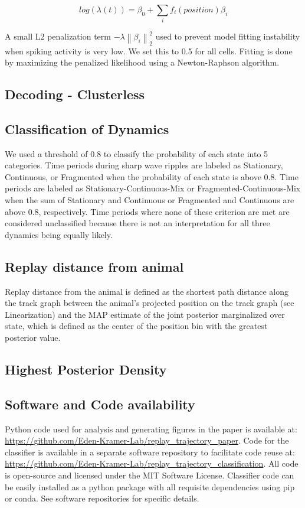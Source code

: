 \documentclass[times, twoside]{zHenriquesLab-StyleBioRxiv}
\newcommand{\norm}[1]{\left\lVert #1 \right\rVert}
\begin{document}
$$log(\lambda(t)) = \beta_{0} + \sum_{i} f_{i}(position)\beta_{i}$$

A small L2 penalization term $-\lambda\norm{\beta_{i}}_{2}^{2}$ used to prevent model fitting instability when spiking activity is very low. We set this to 0.5 for all cells. Fitting is done by maximizing the penalized likelihood using a Newton-Raphson algorithm.

\subsection*{Decoding - Clusterless}

\subsection*{Classification of Dynamics}
We used a threshold of 0.8 to classify the probability of each state into 5 categories. Time periods during sharp wave ripples are labeled as Stationary, Continuous, or Fragmented when the probability of each state is above 0.8. Time periods are labeled as Stationary-Continuous-Mix or Fragmented-Continuous-Mix when the sum of Stationary and Continuous or Fragmented and Continuous are above 0.8, respectively. Time periods where none of these criterion are met are considered unclassified because there is not an interpretation for all three dynamics being equally likely.

\subsection*{Replay distance from animal}
Replay distance from the animal is defined as the shortest path distance along the track graph between the animal's projected position on the track graph (see Linearization) and the MAP estimate of the joint posterior marginalized over state, which is defined as the center of the position bin with the greatest posterior value.

\subsection{Highest Posterior Density}

\subsection*{Software and Code availability}
Python code used for analysis and generating figures in the paper is available at: \url{https://github.com/Eden-Kramer-Lab/replay_trajectory_paper}. Code for the classifier is available in a separate software repository to facilitate code reuse at: \url{https://github.com/Eden-Kramer-Lab/replay_trajectory_classification}. All code is open-source and licensed under the MIT Software License. Classifier code can be easily installed as a python package with all requisite dependencies using pip or conda. See software repositories for specific details.
\end{document}
